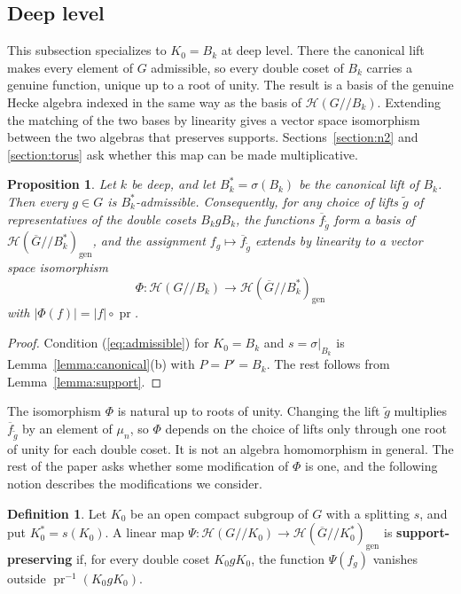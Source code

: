 \documentclass[12pt,letterpaper]{amsart}
\numberwithin{equation}{section}
\newtheorem{proposition}[theorem]{Proposition}
\theoremstyle{definition}
\newtheorem{definition}[theorem]{Definition}
\theoremstyle{remark}
\DeclareMathOperator{\pr}{pr}
\newcommand{\cH}{\mathcal{H}}
\newcommand{\Gbar}{\overline{G}}
\newcommand{\gen}{\mathrm{gen}}
\newcommand{\fbar}{\overline{f}}
\newcommand{\Hgen}{\cH(\Gbar/\!/B_k^*)_{\gen}}
\newcommand{\Hlin}{\cH(G/\!/B_k)}
\begin{document}
\subsection{Deep level}
This subsection specializes to $K_0=B_k$ at deep level. There the
canonical lift makes every element of $G$ admissible, so every double
coset of $B_k$ carries a genuine function, unique up to a root of
unity. The result is a basis of the genuine Hecke algebra indexed in
the same way as the basis of $\Hlin$. Extending the matching of the
two bases by linearity gives a vector space isomorphism between the two
algebras that preserves supports.
Sections~\ref{section:n2} and \ref{section:torus} ask whether this map
can be made multiplicative.

\begin{proposition}
\label{prop:admissible}
Let $k$ be deep, and let $B_k^*=\sigma(B_k)$ be the canonical lift of
$B_k$. Then every $g\in G$ is $B_k^*$-admissible. Consequently, for any
choice of lifts $\tilde g$ of representatives of the double cosets
$B_kgB_k$, the functions $\fbar_{\tilde g}$ form a basis of $\Hgen$,
and the assignment $f_g\mapsto\fbar_{\tilde g}$ extends by linearity to a
vector space isomorphism
\[
\Phi:\Hlin\to\Hgen
\]
with $|\Phi(f)|=|f|\circ\pr$.
\end{proposition}

\begin{proof}
Condition (\ref{eq:admissible}) for $K_0=B_k$ and $s=\sigma|_{B_k}$ is
Lemma~\ref{lemma:canonical}(b) with $P=P'=B_k$. The rest follows from
Lemma~\ref{lemma:support}.
\end{proof}

The isomorphism $\Phi$ is natural up to roots of unity. Changing the
lift $\tilde g$ multiplies $\fbar_{\tilde g}$ by an element of
$\mu_n$, so $\Phi$ depends on the choice of lifts only through one root
of unity for each double coset. It is not an algebra homomorphism in
general. The rest of the paper asks whether some modification of
$\Phi$ is one, and the following notion describes the modifications we
consider.

\begin{definition}
\label{def:supportpreserving}
Let $K_0$ be an open compact subgroup of $G$ with a splitting $s$, and
put $K_0^*=s(K_0)$. A linear map
$\Psi:\cH(G/\!/K_0)\to\cH(\Gbar/\!/K_0^*)_{\gen}$ is
\textbf{support-preserving} if, for every double coset $K_0gK_0$, the
function $\Psi(f_g)$ vanishes outside $\pr^{-1}(K_0gK_0)$.
\end{definition}
\end{document}
